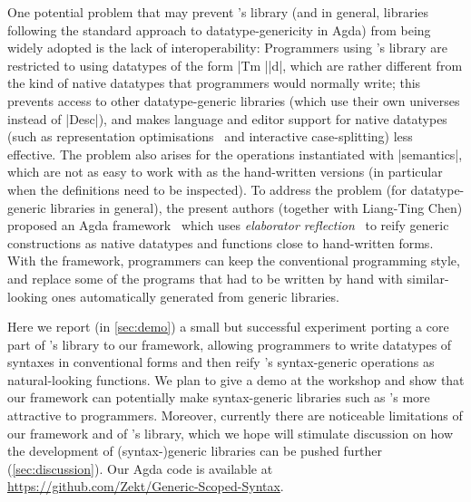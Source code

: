 \documentclass[sigplan,review,fleqn]{acmart}
\renewcommand{\verb}{\collectverb{\color{AgdaFunction}}}
\newcommand{\name}{\collectverb{\it}}
\begin{document}
One potential problem that may prevent \citeauthor{Allais-generic-syntax}'s library (and in general,  libraries following the standard approach to datatype-genericity in Agda) from being widely adopted is the lack of interoperability:
Programmers using \citeauthor{Allais-generic-syntax}'s library are restricted to using datatypes of the form \verb|Tm |\name|d|, which are rather different from the kind of native datatypes that programmers would normally write; this prevents access to other datatype-generic libraries (which use their own universes instead of \verb|Desc|), and makes language and editor support for native datatypes (such as representation optimisations~\citep{Brady-inductive-families-indices} and interactive case-splitting) less effective.
The problem also arises for the operations instantiated with \verb|semantics|, which are not as easy to work with as the hand-written versions (in particular when the definitions need to be inspected).
To address the problem (for datatype-generic libraries in general), the present authors (together with Liang-Ting Chen) proposed an Agda framework~\citep{Ko-NDGP} which uses \emph{elaborator reflection}~\citep{Christiansen-elaborator-reflection} to reify generic constructions as native datatypes and functions close to hand-written forms.
With the framework, programmers can keep the conventional programming style, and replace some of the programs that had to be written by hand with similar-looking ones automatically generated from generic libraries.

Here we report (in \cref{sec:demo}) a small but successful experiment porting a core part of \citeauthor{Allais-generic-syntax}'s library to our framework, allowing programmers to write datatypes of syntaxes in conventional forms and then reify \citeauthor{Allais-generic-syntax}'s syntax-generic operations as natural-looking functions.
We plan to give a demo at the workshop and show that our framework can potentially make syntax-generic libraries such as \citeauthor{Allais-generic-syntax}'s more attractive to programmers.
Moreover, currently there are noticeable limitations of our framework and of \citeauthor{Allais-generic-syntax}'s library, which we hope will stimulate discussion on how the development of (syntax-)generic libraries can be pushed further (\cref{sec:discussion}).
Our Agda code is available at \url{https://github.com/Zekt/Generic-Scoped-Syntax}.
\end{document}
